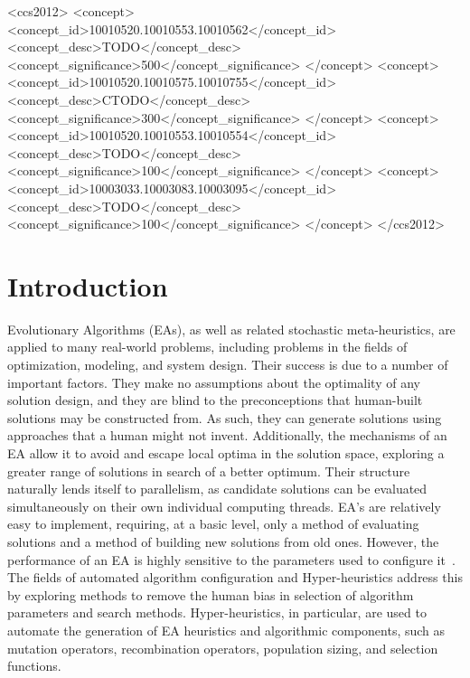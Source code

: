 \documentclass[sigconf]{acmart}
\begin{document}
\begin{CCSXML}
<ccs2012>
 <concept>
  <concept_id>10010520.10010553.10010562</concept_id>
  <concept_desc>TODO</concept_desc>
  <concept_significance>500</concept_significance>
 </concept>
 <concept>
  <concept_id>10010520.10010575.10010755</concept_id>
  <concept_desc>CTODO</concept_desc>
  <concept_significance>300</concept_significance>
 </concept>
 <concept>
  <concept_id>10010520.10010553.10010554</concept_id>
  <concept_desc>TODO</concept_desc>
  <concept_significance>100</concept_significance>
 </concept>
 <concept>
  <concept_id>10003033.10003083.10003095</concept_id>
  <concept_desc>TODO</concept_desc>
  <concept_significance>100</concept_significance>
 </concept>
</ccs2012>  
\end{CCSXML}





\maketitle


\section{Introduction}
\label{Introduction}
Evolutionary Algorithms (EAs), as well as related stochastic meta-heuristics, are applied to many real-world problems, including problems in the fields of optimization, modeling, and system design. Their success is due to a number of important factors. They make no assumptions about the optimality of any solution design, and they are blind to the preconceptions that human-built solutions may be constructed from. As such, they can generate solutions using approaches that a human might not invent. Additionally, the mechanisms of an EA allow it to avoid and escape local optima in the solution space, exploring a greater range of solutions in search of a better optimum. Their structure naturally lends itself to parallelism, as candidate solutions can be evaluated simultaneously on their own individual computing threads. EA's are relatively easy to implement, requiring, at a basic level, only a method of evaluating solutions and a method of building new solutions from old ones. However, the performance of an EA is highly sensitive to the parameters used to configure it~\citep{eiben1999parameter}. The fields of automated algorithm configuration and Hyper-heuristics address this by exploring methods to remove the human bias in selection of algorithm parameters and search methods. Hyper-heuristics, in particular, are used to automate the generation of EA heuristics and algorithmic components, such as mutation operators, recombination operators, population sizing, and selection functions.
\end{document}
